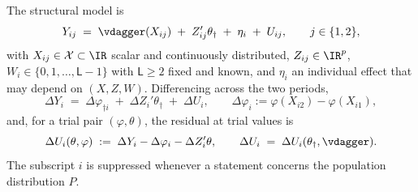 
\begin{definition}\label{def:model}
The structural model is
\begin{equation}\label{eq:levels}
Y_{ij} \;=\; \vdagger(X_{ij}) \;+\; Z_{ij}'\theta_\dagger \;+\; \eta_i \;+\; U_{ij},
\qquad j\in\{1,2\},
\end{equation}
with $X_{ij}\in\mathcal X\subset\IR$ scalar and continuously distributed, $Z_{ij}\in\IR^{p}$,
$W_i\in\{0,1,\dots,\mathsf L-1\}$ with $\mathsf L\ge2$ fixed and known, and $\eta_i$ an individual effect
that may depend on $(X,Z,W)$. Differencing across
the two periods,
\begin{equation}\label{eq:diffs}
\Delta Y_i \;=\; \Delta\varphi_{\dagger i} \;+\; \Delta Z_i'\theta_\dagger \;+\; \Delta U_i,
\qquad \Delta\varphi_i:=\varphi(X_{i2})-\varphi(X_{i1}),
\end{equation}
and, for a trial pair $(\varphi,\theta)$, the residual at trial values is
\begin{equation}\label{eq:trialres}
\Delta U_i(\theta,\varphi)\;:=\;\Delta Y_i-\Delta\varphi_i-\Delta Z_i'\theta ,
\qquad \Delta U_i \;=\; \Delta U_i(\theta_\dagger,\vdagger).
\end{equation}
The subscript $i$ is suppressed whenever a statement concerns the population distribution $P$.
\end{definition}

